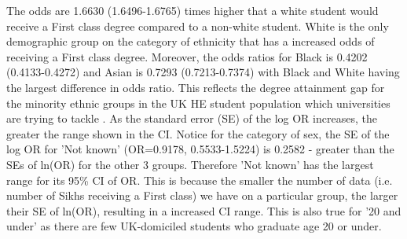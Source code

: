 \documentclass[11pt,a4paper]{article}
\begin{document}
The odds are 1.6630 (1.6496-1.6765) times higher that a white student would receive a First class degree compared to a non-white student. White is the only demographic group on the category of ethnicity that has a increased odds of receiving a First class degree. Moreover, the odds ratios for Black is 0.4202 (0.4133-0.4272) and Asian is 0.7293 (0.7213-0.7374) with Black and White having the largest difference in odds ratio. This reflects the degree attainment gap for the minority ethnic groups in the UK HE student population which universities are trying to tackle \cite{BAME_attainment_gap}.
As the standard error (SE) of the log OR increases, the greater the range shown in the CI. Notice for the category of sex, the SE of the log OR for 'Not known' (OR=0.9178, 0.5533-1.5224) is 0.2582 - greater than the SEs of ln(OR) for the other 3 groups. Therefore 'Not known' has the largest range for its 95\% CI of OR. This is because the smaller the number of data (i.e. number of Sikhs receiving a First class) we have on a particular group, the larger their SE of ln(OR), resulting in a increased CI range. This is also true for '20 and under' as there are few UK-domiciled students who graduate age 20 or under. 
\end{document}
